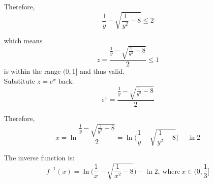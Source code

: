 \documentclass{article}
\begin{document}
\begin{enumerate}
\begin{enumerate}
            Therefore,
            $$ \frac{1}{y} - \sqrt{\frac{1}{y^2}-8} \leq 2  $$
            
            which means
            $$  z = \frac{ \frac{1}{y} - \sqrt{\frac{1}{y^2}-8} }{2} \leq 1 $$
            is within the range $(0, 1]$ and thus valid. \\
            
            Substitute $z=e^x$ back:
            $$ e^x = \frac{ \frac{1}{y} - \sqrt{\frac{1}{y^2}-8} }{2} $$
            
            Therefore,
            $$ x = \ln{ \frac{ \frac{1}{y} - \sqrt{\frac{1}{y^2}-8} }{2} } = \ln{ \Bigg( \frac{1}{y} - \sqrt{\frac{1}{y^2}-8} \Bigg) } - \ln{2} $$
            
            The inverse function is:
            $$ f^{-1}(x) =\ln{ \Bigg( \frac{1}{x} - \sqrt{\frac{1}{x^2}-8} \Bigg) } - \ln{2},\ \textrm{where}\ x \in (0, \frac{1}{3}] $$
            
        \end{enumerate}
        
\end{enumerate}
\end{document}
